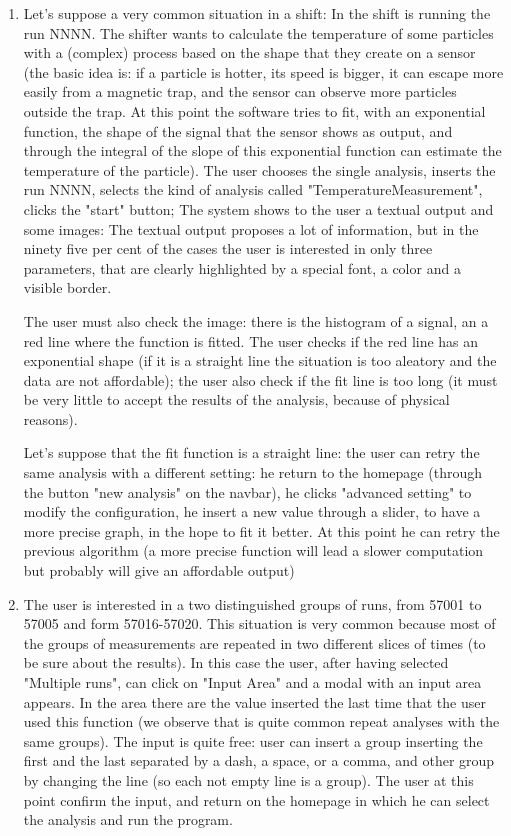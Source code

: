 \begin{enumerate}

\item
Let's suppose a very common situation in a shift: 
In the shift is running the run NNNN. The shifter wants to calculate the temperature of some particles with a (complex) process based on the shape that they create on a sensor (the basic idea is: if a particle is hotter, its speed is bigger, it can escape more easily from a magnetic trap, and the sensor can observe more particles outside the trap. At this point the software tries to fit, with an exponential function, the shape of the signal that the sensor shows as output, and through the integral of the slope of this exponential function can estimate the temperature of the particle).
The user chooses the single analysis, inserts the run NNNN, selects the kind of analysis called "TemperatureMeasurement", clicks the "start" button;
The system shows to the user a textual output and some images: 
The textual output proposes a lot of information, but in the ninety five per cent of the cases the user is interested in only three parameters, that are clearly highlighted by a special font, a color and a visible border. 

The user must also check the image: there is the histogram of a signal, an a red line where the function is fitted. The user checks if the red line
has an exponential shape (if it is a straight line the situation is too aleatory and the data are not affordable); the user also check if the fit line is too long (it must be very little to accept the results of the analysis, because of physical reasons). 

Let's suppose that the fit function is a straight line: the user can retry the same analysis with a different setting: he return to the homepage (through the button "new analysis" on the navbar), he clicks "advanced setting" to modify the configuration, he insert a new value through a slider, to have a more precise graph, in the hope to fit it better. At this point he can retry the previous algorithm (a more precise function will lead a slower computation but probably will give an affordable output)  

\item 
The user is interested in a two distinguished groups of runs, from 57001 to 57005 and form 57016-57020.
This situation is very common because most of the groups of measurements are repeated in two different slices of times (to be sure about the results).
In this case the user, after having selected "Multiple runs", can click on "Input Area" and a modal with an input area appears. In the area there are the value inserted the last time that the user used this function (we observe that is quite common repeat analyses with the same groups). The input is quite free: user can insert a group inserting the first and the last separated by a dash, a space, or a comma, and other group by changing the line (so each not empty line is a group). 
The user at this point confirm the input, and return on the homepage in which he can select the analysis and run the program. 


\end{enumerate}
